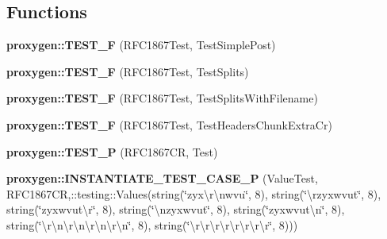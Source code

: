 \subsection*{Functions}
\begin{DoxyCompactItemize}
\item 
{\bf proxygen\+::\+T\+E\+S\+T\+\_\+F} (R\+F\+C1867\+Test, Test\+Simple\+Post)
\item 
{\bf proxygen\+::\+T\+E\+S\+T\+\_\+F} (R\+F\+C1867\+Test, Test\+Splits)
\item 
{\bf proxygen\+::\+T\+E\+S\+T\+\_\+F} (R\+F\+C1867\+Test, Test\+Splits\+With\+Filename)
\item 
{\bf proxygen\+::\+T\+E\+S\+T\+\_\+F} (R\+F\+C1867\+Test, Test\+Headers\+Chunk\+Extra\+Cr)
\item 
{\bf proxygen\+::\+T\+E\+S\+T\+\_\+P} (R\+F\+C1867\+CR, Test)
\item 
{\bf proxygen\+::\+I\+N\+S\+T\+A\+N\+T\+I\+A\+T\+E\+\_\+\+T\+E\+S\+T\+\_\+\+C\+A\+S\+E\+\_\+P} (Value\+Test, R\+F\+C1867\+CR,\+::testing\+::\+Values(string(\char`\"{}zyx\textbackslash{}r\textbackslash{}nwvu\char`\"{}, 8), string(\char`\"{}\textbackslash{}rzyxwvut\char`\"{}, 8), string(\char`\"{}zyxwvut\textbackslash{}r\char`\"{}, 8), string(\char`\"{}\textbackslash{}nzyxwvut\char`\"{}, 8), string(\char`\"{}zyxwvut\textbackslash{}n\char`\"{}, 8), string(\char`\"{}\textbackslash{}r\textbackslash{}n\textbackslash{}r\textbackslash{}n\textbackslash{}r\textbackslash{}n\textbackslash{}r\textbackslash{}n\char`\"{}, 8), string(\char`\"{}\textbackslash{}r\textbackslash{}r\textbackslash{}r\textbackslash{}r\textbackslash{}r\textbackslash{}r\textbackslash{}r\textbackslash{}r\char`\"{}, 8)))
\end{DoxyCompactItemize}
